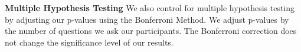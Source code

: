 \textbf{Multiple Hypothesis Testing}
We also control for multiple hypothesis testing by adjusting our p-values using the Bonferroni Method. We adjust p-values by the number of questions we ask our participants. The Bonferroni correction does not change the significance level of our results. 


